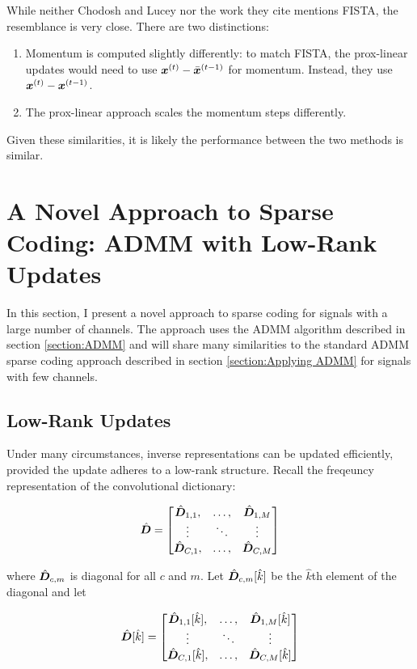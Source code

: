 While neither Chodosh and Lucey nor the work they cite mentions FISTA, the resemblance is very close. There are two distinctions:
\begin{enumerate}
\item Momentum is computed slightly differently: to match FISTA, the prox-linear updates would need to use $\bm{x}^{(t)} - \bar{\bm{x}}^{(t - 1)}$ for momentum. Instead, they use $\bm{x}^{(t)} - \bm{x}^{(t - 1)}$.
\item The prox-linear approach scales the momentum steps differently.
\end{enumerate}

Given these similarities, it is likely the performance between the two methods is similar.

\section{A Novel Approach to Sparse Coding: ADMM with Low-Rank Updates}
In this section, I present a novel approach to sparse coding for signals with a large number of channels. The approach uses the ADMM algorithm described in section \ref{section:ADMM} and will share many similarities to the standard ADMM sparse coding approach described in section \ref{section:Applying ADMM} for signals with few channels.

\subsection{Low-Rank Updates}

Under many circumstances, inverse representations can be updated efficiently, provided the update adheres to a low-rank structure. Recall the freqeuncy representation of the convolutional dictionary:

\begin{equation}
\hat{\bm{D}} = \begin{bmatrix}
\hat{\bm{D}}_{1,1}, & \hdots, & \hat{\bm{D}}_{1,M}\\
\vdots & \ddots & \vdots\\
\hat{\bm{D}}_{C,1}, & \hdots, & \hat{\bm{D}}_{C,M}
\end{bmatrix}
\end{equation}

where $\hat{\bm{D}}_{c,m}$ is diagonal for all $c$ and $m$. Let $\hat{\bm{D}}_{c,m}[\hat{k}]$ be the $\hat{k}$th element of the diagonal and let

\begin{equation}
\hat{\bm{D}}[\hat{k}] = \begin{bmatrix}
\hat{\bm{D}}_{1,1}[\hat{k}], & \hdots, & \hat{\bm{D}}_{1,M}[\hat{k}]\\
\vdots & \ddots & \vdots\\
\hat{\bm{D}}_{C,1}[\hat{k}], & \hdots, & \hat{\bm{D}}_{C,M}[\hat{k}]
\end{bmatrix}
\end{equation}

